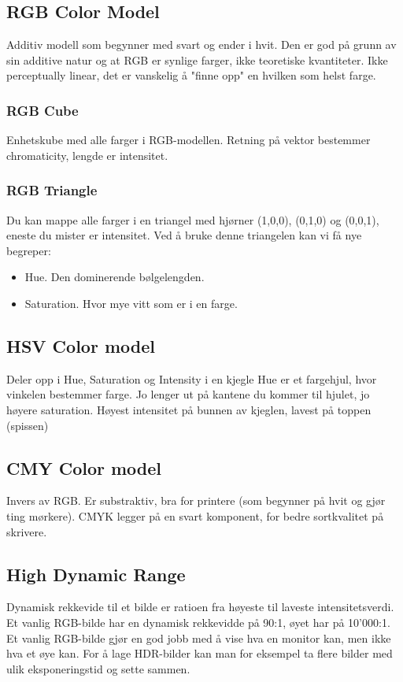 \subsection{RGB Color Model}
Additiv modell som begynner med svart og ender i hvit. Den er god på grunn av sin additive natur og at RGB er synlige farger, ikke teoretiske kvantiteter. Ikke perceptually linear, det er vanskelig å "finne opp" en hvilken som helst farge.

\subsubsection{RGB Cube}
Enhetskube med alle farger i RGB-modellen. Retning på vektor bestemmer chromaticity, lengde er intensitet.

\subsubsection{RGB Triangle}
Du kan mappe alle farger i en triangel med hjørner (1,0,0), (0,1,0) og (0,0,1), eneste du mister er intensitet. Ved å bruke denne triangelen kan vi få nye begreper:
\begin{itemize}
    \item Hue. Den dominerende bølgelengden.
    \item Saturation. Hvor mye vitt som er i en farge.
\end{itemize}

\subsection{HSV Color model}
Deler opp i Hue, Saturation og Intensity i en kjegle Hue er et fargehjul, hvor vinkelen bestemmer farge. Jo lenger ut på kantene du kommer til hjulet, jo høyere saturation. Høyest intensitet på bunnen av kjeglen, lavest på toppen (spissen)

\subsection{CMY Color model}
Invers av RGB. Er substraktiv, bra for printere (som begynner på hvit og gjør ting mørkere). CMYK legger på en svart komponent, for bedre sortkvalitet på skrivere.

\subsection{High Dynamic Range}
Dynamisk rekkevide til et bilde er ratioen fra høyeste til laveste intensitetsverdi. Et vanlig RGB-bilde har en dynamisk rekkevidde på 90:1, øyet har på 10'000:1. Et vanlig RGB-bilde gjør en god jobb med å vise hva en monitor kan, men ikke hva et øye kan. For å lage HDR-bilder kan man for eksempel ta flere bilder med ulik eksponeringstid og sette sammen.







